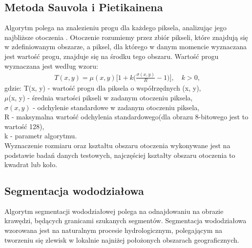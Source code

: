 \subsection{Metoda Sauvola i Pietikainena}
Algorytm polega na znalezieniu progu dla każdego piksela, analizując jego najbliższe otoczenia \cite{sauvola00}. Otoczenie rozumiemy przez zbiór pikseli, które znajdują się w zdefiniowanym obszarze, a piksel, dla którego w danym momencie wyznaczana jest wartość progu, znajduje się na środku tego obszaru. Wartość progu wyznaczana jest według wzoru:
\begin{gather*}
  T(x, y) = \mu(x, y)\Big[1+k\big(\frac{\sigma(x, y)}{R} - 1\big)\Big], \quad k > 0,
\end{gather*}
gdzie:
T(x, y) - wartość progu dla piksela o współrzędnych (x, y),\\
$\mu$(x, y) - średnia wartości pikseli w zadanym otoczeniu piksela,\\
$\sigma(x, y)$ - odchylenie standardowe w zadanym otoczeniu piksela,\\
R - maksymalna wartość odchylenia standardowego(dla obrazu 8-bitowego jest to wartość 128),\\
k - parametr algorytmu. \\
Wyznaczenie rozmiaru oraz kształtu obszaru otoczenia wykonywane jest na podstawie badań danych testowych, najczęściej kształty obszaru otoczenia to kwadrat lub koło.
\subsection{Segmentacja wododziałowa}
Algorytm segmentacji wododziałowej polega na odnajdowaniu na obrazie krawędzi, będących granicami szukanych segmentów. Segmentacja wododziałowa wzorowana jest na naturalnym procesie hydrologicznym, polegającym na tworzeniu się zlewisk w lokalnie najniżej położonych obszarach geograficznych. \\
